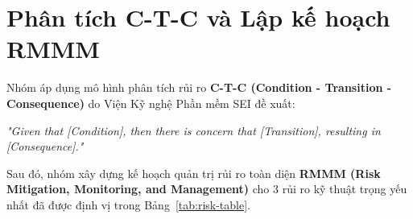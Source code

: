 \section{Phân tích C-T-C và Lập kế hoạch RMMM}
\label{sec:rmmm}

Nhóm áp dụng mô hình phân tích rủi ro \textbf{C-T-C (Condition - Transition - Consequence)} do Viện Kỹ nghệ Phần mềm SEI đề xuất:
\begin{center}
\textit{"Given that [Condition], then there is concern that [Transition], resulting in [Consequence]."}
\end{center}
Sau đó, nhóm xây dựng kế hoạch quản trị rủi ro toàn diện \textbf{RMMM (Risk Mitigation, Monitoring, and Management)} \cite{pressman2020} cho 3 rủi ro kỹ thuật trọng yếu nhất đã được định vị trong Bảng~\ref{tab:risk-table}.

